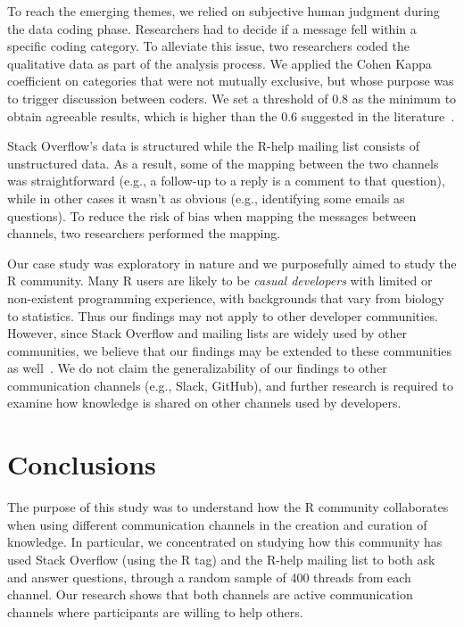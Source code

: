 \documentclass[smallextended]{svjour3}       %
\newcommand{\SO}{Stack Overflow\xspace}
\newcommand{\RH}{R-help\xspace}
\begin{document}
\begin{description}[itemsep=3pt, topsep=2pt, leftmargin=1em, parsep=0pt]

\item[Construct validity:] To reach the emerging themes, we relied on subjective human judgment during the data coding phase. Researchers had to decide if a message fell within a specific coding category. To alleviate this issue, two researchers coded the qualitative data as part of the analysis process. We applied the Cohen Kappa coefficient on categories that were not mutually exclusive, but whose purpose was to trigger discussion between coders. We set a threshold of 0.8 as the minimum to obtain agreeable results, which is higher than the 0.6 suggested in the literature~\cite{Landis1977}.

\item[Internal validity:] \SO's data is structured while the \RH mailing list consists of unstructured data. As a result, some of the mapping between the two channels was straightforward (e.g., a follow-up to a reply is a comment to that question), while in other cases it wasn't as obvious (e.g., identifying some emails as questions). To reduce the risk of bias when mapping the messages between channels, two researchers performed the mapping.  




\item[External validity:] Our case study was exploratory in nature and we purposefully aimed to study the R community. Many R users are likely to be \textit{casual developers} with limited or non-existent programming experience, with backgrounds that vary from biology to statistics. Thus our findings may not apply to other developer communities. However, since \SO and mailing lists are widely used by other communities, we believe that our findings may be extended to these communities as well~\cite{Squire2015a}. We do not claim the generalizability of our findings to other communication channels (e.g., Slack, GitHub), and further research is required to examine how knowledge is shared on other channels used by developers.

\end{description}

 \section{Conclusions}
\label{cha:conclusion}

The purpose of this study was to understand how the R community collaborates when using different communication channels in the creation and curation of knowledge.
In particular, we concentrated on studying how this community has used Stack Overflow (using the R tag) and the \RH mailing list to both ask and answer questions, through a random sample of 400 threads from each channel. Our research shows that both channels are active communication channels where participants are willing to help others. 
\end{document}

